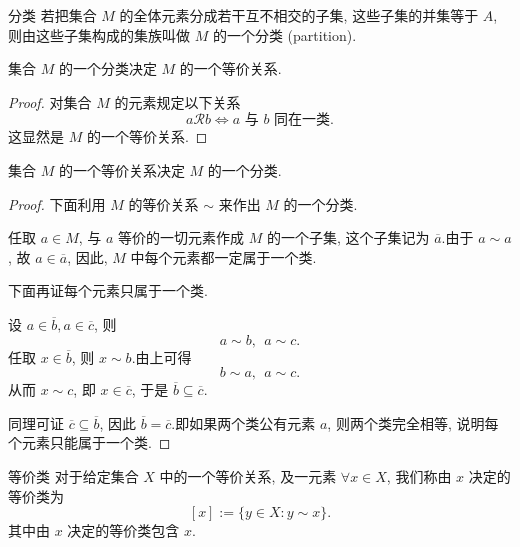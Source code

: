 \documentclass[cn,toc=twocol]{elegantbook}
\begin{document}
\begin{definition}{分类}
若把集合 $M$ 的全体元素分成若干互不相交的子集, 这些子集的并集等于 $A$, 则由这些子集构成的集族叫做 $M$ 的一个分类 (partition).
\end{definition}

\begin{theorem}
	集合 $M$ 的一个分类决定 $M$ 的一个等价关系.
\end{theorem}
\begin{proof}
	对集合 $M$ 的元素规定以下关系
	\[
		a\mathcal{R}b \iff a \text{ 与\ } b \text{ 同在一类}.
	\]
	这显然是 $M$ 的一个等价关系.
\end{proof}
\smallskip

\begin{theorem}
	集合 $M$ 的一个等价关系决定 $M$ 的一个分类.
\end{theorem}
\begin{proof}
	下面利用 $M$ 的等价关系 $\sim$ 来作出 $M$ 的一个分类.
	
	任取 $a\in M$, 与 $a$ 等价的一切元素作成 $M$ 的一个子集, 这个子集记为 $\overline{a}$.由于 $a\sim a$, 故 $a \in \overline{a}$, 因此, $M$ 中每个元素都一定属于一个类.
	
	下面再证每个元素只属于一个类.
	
	设 $a\in\overline{b}, a\in\overline{c}$, 则
	\[
		a\sim b ,  \ \ a\sim c.
	\]
	任取 $x \in \overline{b}$, 则 $x\sim b$.由上可得 
	\[
		b\sim a ,  \ \ a\sim c.
	\]
	从而 $x\sim c$, 即 $x\in\overline{c}$, 于是 $\overline{b} \subseteq\overline{c}$.
	
	同理可证 $\overline{c} \subseteq\overline{b}$, 因此 $\overline{b}=\overline{c}$.即如果两个类公有元素 $a$, 则两个类完全相等, 说明每个元素只能属于一个类. 
	
\end{proof}
\smallskip

\begin{definition}{等价类}
	对于给定集合 $X$ 中的一个等价关系, 及一元素 $\forall x\in X$, 我们称由 $x$ 决定的等价类为
	\[
		[x] := \{y\in X:y\sim x\}.
	\]
	其中由 $x$ 决定的等价类包含 $x$.
\end{definition}


\end{document}
